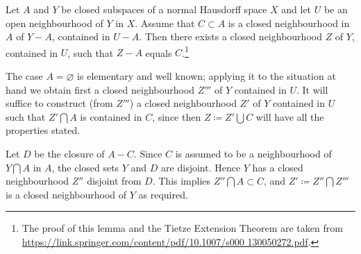\begin{lemma}
    Let $A$ and $Y$ be closed subspaces of a normal Hausdorff 
    space $X$ and let $U$ be an open neighbourhood of $Y$ in 
    $X$. Assume that $C\subset A$ is a closed neighbourhood 
    in $A$ of $Y-A$, contained in $U-A$. Then there exists a 
    closed neighbourhood $Z$ of $Y$, contained in $U$, such 
    that $Z-A$ equals $C$.\footnote{The proof of this lemma 
    and the Tietze Extension Theorem are taken from 
    \url{https://link.springer.com/content/pdf/10.1007/s000
    130050272.pdf}.}
\end{lemma}
\begin{pf}
    The case $A = \varnothing$ is elementary and well known; 
    applying it to the situation at hand we obtain first a 
    closed neighbourhood $Z'''$ of $Y$ contained in $U$. It 
    will suffice to construct (from $Z'''$) a closed 
    neighbourhood $Z'$ of $Y$ contained in $U$ such that
    $Z'\bigcap A$ is contained in $C$, since then $Z\coloneqq 
    Z'\bigcup C$ will have all the properties stated.

    Let $D$ be the closure of $A-C$. Since $C$ is assumed to 
    be a neighbourhood of $Y\bigcap A$ in $A$, the closed sets 
    $Y$ and $D$ are disjoint. Hence $Y$ has a closed 
    neighbourhood $Z''$ disjoint from $D$. This implies 
    $Z''\bigcap A\subset C$, and $Z'\coloneqq Z''\bigcap Z'''$ 
    is a closed neighbourhood of $Y$ as required.
\end{pf}

